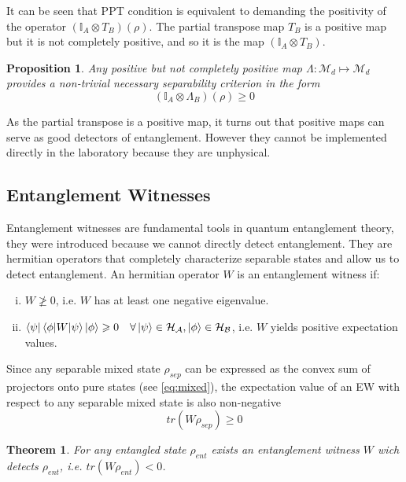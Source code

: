 \documentclass[10pt,a4paper]{book}
\numberwithin{equation}{chapter}
\numberwithin{figure}{chapter}
\numberwithin{table}{chapter}
\newtheorem{theorem}{Theorem}[section]
\newtheorem{prop}{Proposition}[section]
\begin{document}
It can be seen that PPT condition is equivalent to demanding the positivity of the operator $(\mathbb{I}_A \otimes T_B)(\rho)$. The partial transpose map $T_B$ is a positive map but it is not completely positive, and so it is the map $(\mathbb{I}_A \otimes T_B)$. 
\begin{prop} Any positive but not completely positive map $\Lambda: \mathcal{M}_d \longmapsto \mathcal{M}_d$ provides a non-trivial necessary separability criterion in the form
\begin{equation}
(\mathbb{I}_A \otimes \Lambda_B)(\rho)\geqslant 0
\end{equation}
\end{prop}

As the partial transpose is a positive map, it turns out that positive maps can serve as good detectors of entanglement. However they cannot be implemented directly in the laboratory because they are unphysical.
\subsection{Entanglement Witnesses}
Entanglement witnesses are fundamental tools in quantum entanglement theory, they were introduced because we cannot directly detect entanglement. They are hermitian operators that completely characterize separable states and allow us to detect entanglement. An hermitian operator $W$ is an entanglement witness if:
\begin{enumerate}[(i)]
\item $W \ngeqslant 0$, i.e. $W$ has at least one negative eigenvalue.
\item $\braket{\psi |\braket{\phi |W|\psi}|\phi}\geqslant 0 \quad \forall \ket{\psi}\in \mathcal{H_A}, \ket{\phi}\in \mathcal{H_B} $, i.e. $W$ yields positive expectation values.
\end{enumerate}
Since any separable mixed state $\rho_{sep}$ can be expressed as the convex sum of projectors onto pure states (see \autoref{eq:mixed}), the expectation value of an EW with respect to any separable mixed state is also non-negative
\begin{equation}
tr\left(W \rho_{sep} \right) \geqslant 0
\end{equation}
\begin{theorem} For any entangled state $\rho_{ent}$ exists an entanglement witness $W$ wich detects $\rho_{ent}$, i.e. $tr \left( W \rho_{ent} \right) < 0 $.
\label{ewtheo}
\end{theorem}
\end{document}
